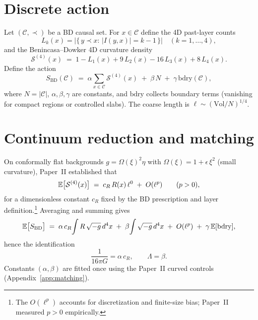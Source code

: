\section{Discrete action}
Let $(\mathcal{C},\prec)$ be a BD causal set. For $x\in\mathcal{C}$ define the 4D past-layer counts
\begin{equation}
L_k(x)=\big|\{\,y\prec x:\,|I(y,x)|=k-1\,\}\big|\quad (k=1,\dots,4),
\end{equation}
and the Benincasa--Dowker 4D curvature density \citep{BenincasaDowker2010}
\begin{equation}
\label{eq:BDdensity}
\mathcal{S}^{(4)}(x)\;=\;1 - L_1(x) + 9\,L_2(x) - 16\,L_3(x) + 8\,L_4(x).
\end{equation}
Define the action
\begin{equation}
\label{eq:SBD}
S_{\mathrm{BD}}(\mathcal{C}) \;=\; \alpha \sum_{x\in\mathcal{C}} \mathcal{S}^{(4)}(x) \;+\; \beta\,N \;+\; \gamma\,\mathrm{bdry}(\mathcal{C}),
\end{equation}
where $N=|\mathcal{C}|$, $\alpha,\beta,\gamma$ are constants, and $\mathrm{bdry}$ collects boundary terms (vanishing for compact regions or controlled slabs). The coarse length is $\ell \sim (\mathrm{Vol}/N)^{1/4}$.

\section{Continuum reduction and matching}
On conformally flat backgrounds $g=\Omega(\xi)^2\eta$ with $\Omega(\xi)=1+\epsilon\,\xi^2$ (small curvature), Paper~II established that
\begin{equation}
\label{eq:cont-limit}
\mathbb{E}\big[\mathcal{S}^{(4)}(x)\big] \;=\; c_R\,R(x)\,\ell^0 \;+\; O(\ell^p) \qquad (p>0),
\end{equation}
for a dimensionless constant $c_R$ fixed by the BD prescription and layer definition.\footnote{The $O(\ell^p)$ accounts for discretization and finite-size bias; Paper~II measured $p>0$ empirically.}
Averaging and summing gives
\begin{equation}
\label{eq:EHmatch}
\mathbb{E}\big[S_{\mathrm{BD}}\big] \;=\; \alpha\,c_R \!\int R\,\sqrt{-g}\,d^4x \;+\; \beta \!\int \sqrt{-g}\,d^4x
\;+\; O(\ell^p) \;+\; \gamma\,\mathbb{E}[\mathrm{bdry}],
\end{equation}
hence the identification
\begin{equation}
\label{eq:constants}
\frac{1}{16\pi G}=\alpha\,c_R,\qquad \Lambda=\beta.
\end{equation}
Constants $(\alpha,\beta)$ are fitted once using the Paper~II curved controls (Appendix~\ref{app:matching}).

